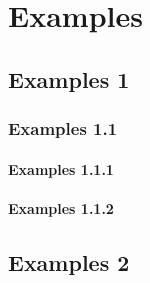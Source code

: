 \chapter{Examples}
\section{Examples 1}
\subsection{Examples 1.1}
\subsubsection{Examples 1.1.1}
\lipsum \cite{ref1} \cite{ref2}
\subsubsection{Examples 1.1.2}
\lipsum
\section{Examples 2}
\lipsum